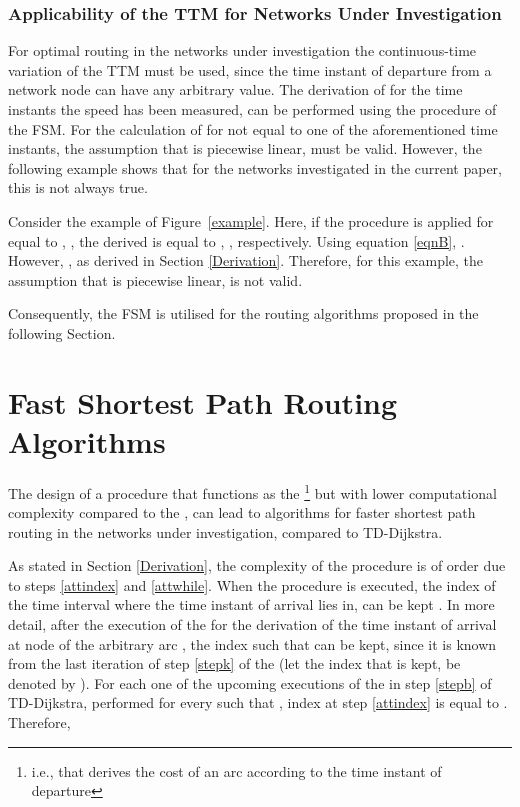\documentclass[conference]{IEEEtran}
\begin{document}
\subsubsection{Applicability of the TTM for Networks Under Investigation} \label{nonlinear}

For optimal routing in the networks under investigation the continuous-time variation of the TTM must be used, since the time instant of departure from a network node can have any arbitrary value.  The derivation of  for the time instants the speed has been measured, can be performed using the  procedure of the FSM. For the calculation of  for  not equal to one of the aforementioned time instants, the  assumption that  is piecewise linear, must be valid. However, the following example shows that for the networks investigated in the current paper, this is not always true.

Consider the example of Figure~\ref{example}. Here, if the  procedure is applied for  equal to , , the derived  is equal to , , respectively. Using equation \ref{eqnB}, . However, , as derived in Section \ref{Derivation}. Therefore, for this example, the assumption that   is piecewise linear, is not valid. 

Consequently, the FSM is utilised for the routing algorithms proposed in the following Section.

\section{Fast Shortest Path Routing Algorithms} \label{routing}

The design of a procedure that functions as the \footnote{i.e., that derives the cost of an arc according to the time instant of departure} but with lower computational complexity compared to the , can lead to algorithms for faster shortest path routing in the networks under investigation, compared to TD-Dijkstra. 

As stated in Section \ref{Derivation}, the complexity of the  procedure is of order  due to steps \ref{attindex} and \ref{attwhile}. When the  procedure is executed, the index of the time interval where the time instant of arrival lies in, can be kept \cite{Sung}. In more detail, after the execution of the  for the derivation of the time instant  of arrival at node  of the arbitrary arc , the index  such that  can be kept, since it is known from the last iteration of step \ref{stepk} of the  (let the index that is kept, be denoted by ). For each one of the upcoming executions of the  in step \ref{stepb} of TD-Dijkstra, performed for every  such that , index  at step \ref{attindex} is equal to . Therefore,
\end{document}
